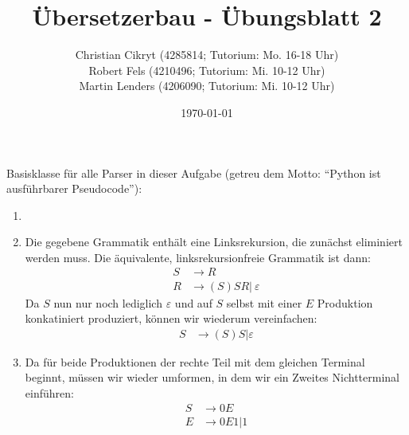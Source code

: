 \documentclass[a4paper,10pt]{scrartcl}
\title{Übersetzerbau - Übungsblatt 2}
\author{Christian Cikryt (4285814; Tutorium: Mo. 16-18 Uhr)\\
  Robert Fels (4210496; Tutorium: Mi. 10-12 Uhr)\\
  Martin Lenders (4206090; Tutorium: Mi. 10-12 Uhr)
  }
\date{\today}
\begin{document}
\maketitle

\section{}
Basisklasse für alle Parser in dieser Aufgabe (getreu dem Motto: "`Python ist ausführbarer Pseudocode"'):

\begin{enumerate}
 \item  \hspace{0cm}
 \item  Die gegebene Grammatik enthält eine Linksrekursion, die zunächst eliminiert werden muss.
        Die äquivalente, linksrekursionfreie Grammatik ist dann:
        \begin{align*}
            S &\to R \\
            R &\to (S)SR |\ \varepsilon
        \end{align*}
        Da $S$ nun nur noch lediglich $\varepsilon$ und auf $S$ selbst mit einer $E$ Produktion konkatiniert produziert,
        können wir wiederum vereinfachen:
        \begin{align*}
            S &\to (S)S | \varepsilon
        \end{align*}
        
 \item	Da für beide Produktionen der rechte Teil mit dem gleichen Terminal beginnt, müssen wir wieder umformen, in dem wir ein 
        Zweites Nichtterminal einführen:
        \begin{align*}
            S &\to 0E \\
            E &\to 0E1 | 1
        \end{align*}
        
\end{enumerate}
\end{document}
